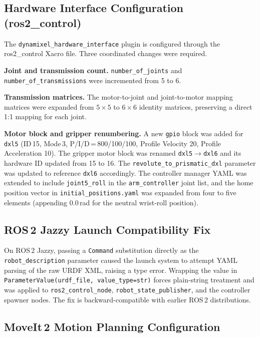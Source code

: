\documentclass[conference]{IEEEtran}
\begin{document}
		\subsection{Hardware Interface Configuration (ros2\_control)}
		
		The \texttt{dynamixel\_hardware\_interface} plugin is configured
		through the ros2\_control Xacro file. Three coordinated changes were
		required.
		
		\textbf{Joint and transmission count.}
		\texttt{number\_of\_joints} and \texttt{number\_of\_transmissions}
		were incremented from 5 to 6.
		
		\textbf{Transmission matrices.}
		The motor-to-joint and joint-to-motor mapping matrices were expanded
		from $5\!\times\!5$ to $6\!\times\!6$ identity matrices, preserving
		a direct 1:1 mapping for each joint.
		
		\textbf{Motor block and gripper renumbering.}
		A new \texttt{gpio} block was added for \texttt{dxl5}
		(ID\,15, Mode\,3, P/I/D\,=\,800/100/100, Profile Velocity 20,
		Profile Acceleration 10). The gripper motor block was renamed
		\texttt{dxl5}$\rightarrow$\texttt{dxl6} and its hardware ID updated
		from 15 to 16. The \texttt{revolute\_to\_prismatic\_dxl} parameter
		was updated to reference \texttt{dxl6} accordingly. The controller
		manager YAML was extended to include \texttt{joint5\_roll} in the
		\texttt{arm\_controller} joint list, and the home position vector in
		\texttt{initial\_positions.yaml} was expanded from four to five
		elements (appending 0.0\,rad for the neutral wrist-roll position).
		
		\subsection{ROS\,2 Jazzy Launch Compatibility Fix}
		
		On ROS\,2 Jazzy, passing a \texttt{Command} substitution directly as
		the \texttt{robot\_description} parameter caused the launch system to
		attempt YAML parsing of the raw URDF XML, raising a type error.
		Wrapping the value in \texttt{ParameterValue(urdf\_file,
			value\_type=str)} forces plain-string treatment and was applied to
		\texttt{ros2\_control\_node}, \texttt{robot\_state\_publisher}, and
		the controller spawner nodes. The fix is backward-compatible with
		earlier ROS\,2 distributions.
		
		\subsection{MoveIt\,2 Motion Planning Configuration}
		
\end{document}
